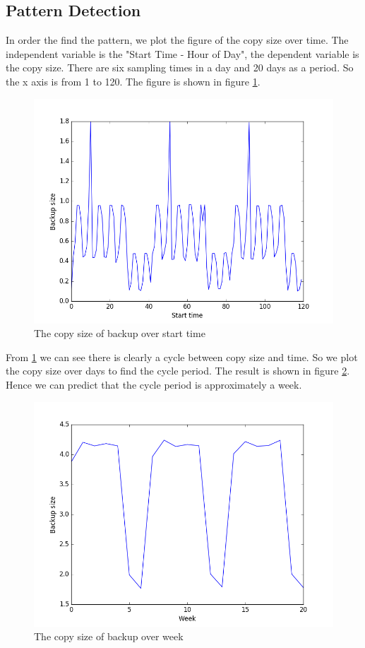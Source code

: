 \documentclass{article}
\begin{document}
\subsection{Pattern Detection}
In order the find the pattern, we plot the figure of the copy size over time. The independent variable is the "Start Time - Hour of Day", the dependent variable is the copy size. There are six sampling times in a day and 20 days as a period. So the x axis is from 1 to 120. The figure is shown in figure \ref{fig:start_time}.
\begin{figure}[htbp]
\centering
\includegraphics[width=.6\textwidth]{pattern_start.png}
\caption{The copy size of backup over start time}
\label{fig:start_time}
\end{figure}
From \ref{fig:start_time} we can see there is clearly a cycle between copy size and time. So we plot the copy size over days to find the cycle period. The result is shown in figure \ref{fig:day}. Hence we can predict that the cycle period is approximately a week.
\begin{figure}[htbp]
\centering
\includegraphics[width=.6\textwidth]{pattern_week.png}
\caption{The copy size of backup over week}
\label{fig:day}
\end{figure}
\end{document}
